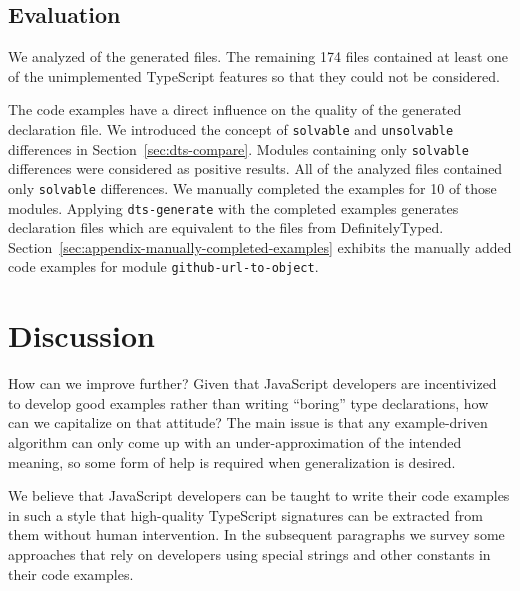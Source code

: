 \documentclass[sigplan,screen]{acmart}
\newcommand{\secref}[1]{Section~\ref{#1}}
\begin{document}
\subsection{Evaluation}
\label{sec:experiments-evaluation}
We analyzed \CountModulesOnlySolvableDifferences{} of the \CountModulesGeneratedDeclarationFile{} generated files. The remaining 174 files contained at least one
of the unimplemented TypeScript features so that they could not be
considered.


The code examples have a direct influence on the quality of the generated declaration file. We introduced the
concept of \texttt{solvable} and \texttt{unsolvable} differences in
\secref{sec:dts-compare}. Modules containing only \texttt{solvable} differences were
considered as positive results. All of the analyzed files contained only \texttt{solvable} differences.
We manually completed the
examples for 10 of those modules. Applying \texttt{dts-generate} with the completed
examples generates declaration files which are equivalent to the files from DefinitelyTyped.
\secref{sec:appendix-manually-completed-examples} exhibits the manually added code examples
for module \texttt{github-url-to-object}.

\section{Discussion}
\label{sec:discussion}

How can we improve further? Given that JavaScript developers are incentivized to develop good
examples rather than writing ``boring'' type declarations, how can we capitalize on that attitude?
The main issue is that any example-driven algorithm can only come up with an
under-approximation of the intended meaning, so some form of help is required when
generalization is desired.

We believe that  JavaScript developers can be taught to write their
code examples in such a style that high-quality TypeScript signatures
can be extracted from them without human intervention. 
In the subsequent paragraphs we survey some approaches that rely on
developers using special strings and other constants in their code examples.
\end{document}
